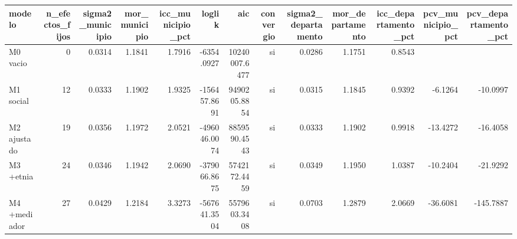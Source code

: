 \begin{tabular}{lrrrrrrrrrrrr}
\toprule
modelo & n\_efectos\_fijos & sigma2\_municipio & mor\_municipio & icc\_municipio\_pct & loglik & aic & convergio & sigma2\_departamento & mor\_departamento & icc\_departamento\_pct & pcv\_municipio\_pct & pcv\_departamento\_pct \\
\midrule
M0 vacio & 0 & 0.0314 & 1.1841 & 1.7916 & -6354.0927 & 10240007.6477 & si & 0.0286 & 1.1751 & 0.8543 &  &  \\
M1 social & 12 & 0.0333 & 1.1902 & 1.9325 & -156457.8691 & 9490205.8854 & si & 0.0315 & 1.1845 & 0.9392 & -6.1264 & -10.0997 \\
M2 ajustado & 19 & 0.0356 & 1.1972 & 2.0521 & -496046.0074 & 8859590.4543 & si & 0.0333 & 1.1902 & 0.9918 & -13.4272 & -16.4058 \\
M3 +etnia & 24 & 0.0346 & 1.1942 & 2.0690 & -379066.8675 & 5742172.4459 & si & 0.0349 & 1.1950 & 1.0387 & -10.2404 & -21.9292 \\
M4 +mediador & 27 & 0.0429 & 1.2184 & 3.3273 & -567641.3504 & 5579603.3408 & si & 0.0703 & 1.2879 & 2.0669 & -36.6081 & -145.7887 \\
\bottomrule
\end{tabular}
